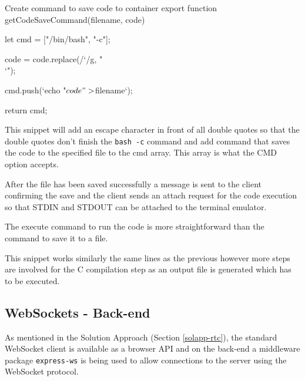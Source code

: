 \begin{sexylisting}{Create command to save code to container}
export function getCodeSaveCommand(filename, code) {
    let cmd = ["/bin/bash", "-c"];

    code = code.replace(/`/g, "\\`");

    cmd.push(`echo "${code}" > ${filename}`);

    return cmd;
}
\end{sexylisting}

This snippet will add an escape character in front of all double quotes so that the double quotes don't finish the \texttt{bash -c} command and add command that saves the code to the specified file to the cmd array. This array is what the CMD option accepts. 

After the file has been saved successfully a message is sent to the client confirming the save and the client sends an attach request for the code execution so that STDIN and STDOUT can be attached to the terminal emulator.

The execute command to run the code is more straightforward than the command to save it to a file.


This snippet works similarly the same lines as the previous however more steps are involved for the C compilation step as an output file is generated which has to be executed.

\subsection{WebSockets - Back-end} \label{impl-ws-back-end}

As mentioned in the Solution Approach (Section \ref{solapp-rtc}), the standard WebSocket client is available as a browser API and on the back-end a middleware package \texttt{express-ws} \cite{expressws} is being used to allow connections to the server using the WebSocket protocol.

